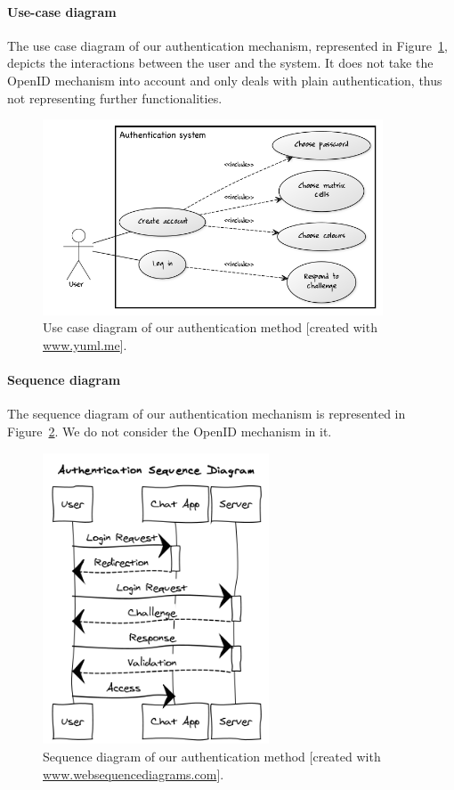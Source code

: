 \documentclass[11pt,a4paper]{article}
\begin{document}
\paragraph{Use-case diagram} The use case diagram of our authentication mechanism, represented in Figure~\ref{fig:usecasedia}, depicts the interactions between the user and the system. It does not take the OpenID mechanism into account and only deals with plain authentication, thus not representing further functionalities.
\begin{figure}
\centering
\includegraphics[width=0.9\textwidth]{usecasedia.png}
\caption{Use case diagram of our authentication method [created with \url{www.yuml.me}].}
\label{fig:usecasedia}
\end{figure}


\paragraph{Sequence diagram} The sequence diagram of our authentication mechanism is represented in Figure~\ref{fig:seqdia}. We do not consider the OpenID mechanism in it.
\begin{figure}
\centering
\includegraphics[width=0.6\textwidth]{seqdia.png}
\caption{Sequence diagram of our authentication method [created with \url{www.websequencediagrams.com}].}
\label{fig:seqdia}
\end{figure}
\end{document}
